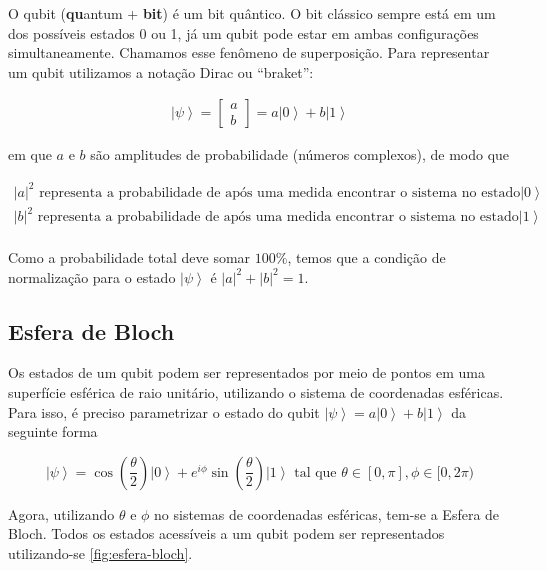 O qubit (\textbf{qu}antum + \textbf{bit}) é um bit quântico.
O bit clássico sempre está em um dos possíveis estados 0 ou 1, já um qubit
pode estar em ambas configurações simultaneamente.
Chamamos esse fenômeno de {superposição}.
Para representar um qubit utilizamos a notação Dirac ou “braket”:

\[\begin{aligned}
\left | \psi \right \rangle = \begin{bmatrix} a \\ b \end{bmatrix} = a \left| 0 \right \rangle + b \left| 1 \right \rangle
\end{aligned}\]

em que \(a\) e \(b\) são {amplitudes de probabilidade} (números
complexos), de modo que

\begin{gather*}
    |a|^2 \text{ representa a probabilidade de após uma medida encontrar o sistema no estado}
\left| 0 \right\rangle\\
    |b|^2 \text{ representa a probabilidade de após uma medida encontrar o sistema no estado}
\left| 1 \right\rangle\\
\end{gather*}

Como a probabilidade total deve somar \(100\%\), temos que a {condição
de normalização} para o estado \(\left| \psi \right\rangle\) é
\(|a|^2 + |b|^2 = 1\).

\subsection{Esfera de Bloch}\label{subsec:esfera-de-bloch}

Os estados de um qubit podem ser representados por meio de pontos em uma
superfície esférica de raio unitário, utilizando o sistema de
coordenadas esféricas.
Para isso, é preciso parametrizar o estado do qubit
\(\left| \psi \right\rangle = a \left| 0 \right\rangle + b \left| 1 \right\rangle\)
da seguinte forma

\[\left| \psi \right\rangle = \cos\left(  \dfrac{\theta}{2} \right) \left| 0 \right\rangle + e^{i\phi} \sin\left( \dfrac{\theta}{2} \right) \left| 1 \right\rangle \text{ tal que } \theta \in [0, \pi], \phi \in [0, 2\pi)\]

Agora, utilizando \(\theta\) e \(\phi\) no sistemas de coordenadas
esféricas, tem-se a Esfera de Bloch.
Todos os estados acessíveis a um qubit podem ser representados utilizando-se \autoref{fig:esfera-bloch}.

